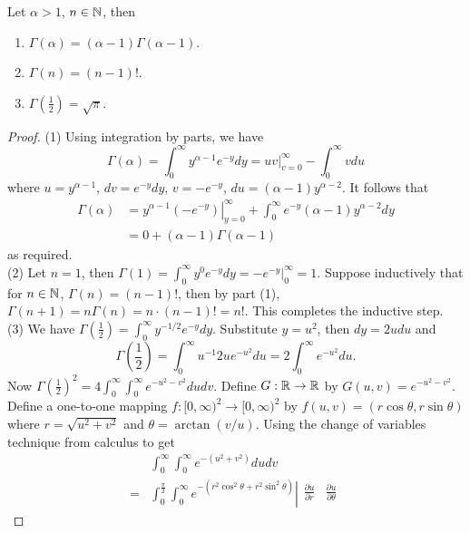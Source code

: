 \documentclass[11pt,fleqn]{book} %
\begin{document}
\begin{proposition} \label{prop:146}
Let \(\alpha > 1\), \(n \in \mathbb{N}\), then
\begin{enumerate}
\item \(\Gamma(\alpha) = (\alpha - 1)\Gamma(\alpha - 1)\).
\item \(\Gamma(n) = (n - 1)!\).
\item \(\Gamma\left(\frac 1 2\right) = \sqrt{\pi}\).
\end{enumerate}
\end{proposition}
\begin{proof} (1) Using integration by parts, we have
\[
\Gamma(\alpha) = \int_0^\infty y^{\alpha - 1}e^{-y}dy = \left.uv\right|_{v=0}^\infty - \int_0^\infty v du
\]
where \(u = y^{\alpha - 1}\), \(dv = e^{-y}dy\), \(v = -e^{-y}\), \(du = (\alpha - 1)y^{\alpha - 2}\). It follows that
\[
\begin{aligned}
\Gamma(\alpha) &= \left.y^{\alpha - 1}(-e^{-y})\right|_{y=0}^\infty + \int_0^\infty e^{-y}(\alpha - 1)y^{\alpha - 2}dy \\
&= 0 + (\alpha - 1)\Gamma(\alpha - 1)
\end{aligned}
\]
as required. \\
(2) Let \(n = 1\), then \(\Gamma(1) = \int_0^\infty y^0e^{-y}dy = \left.-e^{-y}\right|_0^\infty = 1\). Suppose inductively that for \(n \in \mathbb{N}\), \(\Gamma(n) = (n - 1)!\), then by part (1), \(\Gamma(n+1) = n\Gamma(n) = n\cdot(n-1)! = n!\). This completes the inductive step. \\
(3) We have \(\Gamma\left(\frac 1 2\right) = \int_0^\infty y^{-1/2}e^{-y}dy\). Substitute \(y = u^2\), then \(dy = 2udu\) and
\[
\Gamma\left(\frac 1 2\right) = \int_0^\infty u^{-1}2ue^{-u^2}du = 2\int_0^\infty e^{-u^2}du.
\]
\indent Now \(\Gamma\left(\frac 1 2\right)^2 = 4\int_0^\infty\int_0^\infty e^{-u^2 - v^2}dudv\). Define \(G:\mathbb{R} \rightarrow\mathbb{R}\) by \(G(u, v) = e^{-u^2-v^2}\). Define a one-to-one mapping \(f:[0, \infty)^2 \rightarrow [0, \infty)^2\) by \(f(u, v) = (r\cos\theta, r\sin\theta)\) where \(r = \sqrt{u^2 + v^2}\) and \(\theta = \arctan(v / u)\). Using the change of variables technique from calculus to get
\[
\begin{aligned}
&\int_0^\infty\int_0^\infty e^{-(u^2 + v^2)} dudv \\
= &\int_0^{\frac\pi2}\int_0^\infty e^{-(r^2\cos^2\theta + r^2\sin^2\theta)}\left|
\begin{smallmatrix}
\frac{\partial u}{\partial r} & \frac{\partial u}{\partial \theta} \\

\end{smallmatrix}
\end{aligned}\]
\end{proof}
\end{document}
